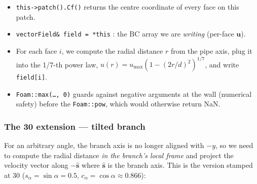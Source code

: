 \documentclass[11pt,a4paper]{article}
\begin{document}
\begin{itemize}[leftmargin=1.5em,topsep=2pt]
    \item \texttt{this->patch().Cf()} returns the centre coordinate of
    every face on this patch.
    \item \texttt{vectorField\& field = *this} : the BC array we are
    \emph{writing} (per-face $\mathbf{u}$).
    \item For each face $i$, we compute the radial distance $r$ from
    the pipe axis, plug it into the 1/7-th power law,
    \(u(r) = u_\mathrm{max}(1 - (2r/d)^2)^{1/7}\), and write
    \texttt{field[i]}.
    \item \texttt{Foam::max(\dots,\,0)} guards against negative
    arguments at the wall (numerical safety) before the
    \texttt{Foam::pow}, which would otherwise return NaN.
\end{itemize}

\subsubsection{The 30\textdegree{} extension --- tilted branch}

For an arbitrary angle, the branch axis is no longer aligned with $-y$,
so we need to compute the radial distance \emph{in the branch's local
frame} and project the velocity vector along $-\hat{\mathbf{s}}$ where
$\hat{\mathbf{s}}$ is the branch axis. This is the version stamped at
30\textdegree{} (\(s_\alpha = \sin\alpha = 0.5,\,c_\alpha = \cos\alpha
\approx 0.866\)):
\end{document}
